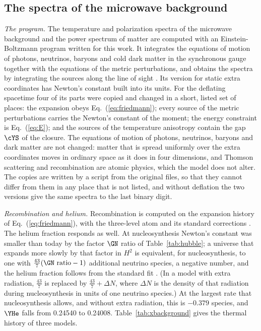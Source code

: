 \subsection{The spectra of the microwave background}
\label{sec:spectra}

\emph{The program.} The temperature and polarization spectra of the microwave background and the
power spectrum of matter are computed with an Einstein-Boltzmann program written for this work. It
integrates the equations of motion of photons, neutrinos, baryons and cold dark matter in the
synchronous gauge \cite{MaBertschinger1995} together with the equations of the metric perturbations,
and obtains the spectra by integrating the sources along the line of sight
\cite{SeljakZaldarriaga1996}. Its version for static extra coordinates has Newton's constant built
into its units. For the deflating spacetime four of its parts were copied and changed in a short,
listed set of places: the
expansion obeys Eq.~(\ref{eq:friedmann}); every source of the metric perturbations carries the
Newton's constant of the moment; the energy constraint is Eq.~(\ref{eq:E}); and the sources of the
temperature anisotropy contain the gap $\cYS$ of the closure. The equations of motion of photons,
neutrinos, baryons and dark matter are not changed: matter that is spread uniformly over the extra
coordinates moves in ordinary space as it does in four dimensions, and Thomson scattering and
recombination are atomic physics, which the model does not alter. The copies are written by a script
from the original files, so that they cannot differ from them in any place that is not listed, and
without deflation the two versions give the same spectra to the last binary digit.

\emph{Recombination and helium.} Recombination is computed on the expansion history of
Eq.~(\ref{eq:friedmann}), with the three-level atom and its standard corrections
\cite{SeagerSasselovScott1999}. The helium fraction responds as well. At nucleosynthesis Newton's
constant was smaller than today by the factor $\GN$ ratio of Table~\ref{tab:hubble}; a universe that
expands more slowly by that factor in $H^{2}$ is equivalent, for nucleosynthesis, to one with
$\tfrac{43}{7}(\GN\ \text{ratio}-1)$ additional neutrino species, a negative number, and the helium
fraction follows from the standard fit \cite{Planck2015XIII}. (In a model with extra radiation,
$\tfrac{43}{7}$ is replaced by $\tfrac{43}{7}+\Delta N$, where $\Delta N$ is the density of that
radiation during nucleosynthesis in units of one neutrino species.) At the largest rate that
nucleosynthesis allows, and without extra radiation, this is $-0.379$ species, and $\YHe$ falls
from 0.24540 to 0.24008. Table~\ref{tab:xbackground} gives the thermal history of three models.

